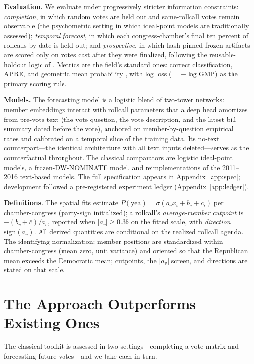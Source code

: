 \documentclass[12pt]{article}
\begin{document}
\textbf{Evaluation.} We evaluate under progressively stricter
information constraints: \emph{completion}, in which random votes are
held out and same-rollcall votes remain observable (the psychometric
setting in which ideal-point models are traditionally assessed);
\emph{temporal forecast}, in which each congress-chamber's final ten
percent of rollcalls by date is held out; and \emph{prospective}, in
which hash-pinned frozen artifacts are scored only on votes cast
after they were finalized, following the reusable-holdout logic of
\citet{dwork2015holdout}. Metrics are the field's standard ones:
correct classification, APRE, and geometric mean probability
\citep{carroll2013structure}, with log loss ($= -\log \mathrm{GMP}$)
as the primary scoring rule.

\textbf{Models.} The forecasting model is a logistic blend of
two-tower networks: member embeddings interact with rollcall
parameters that a deep head amortizes from pre-vote text (the vote
question, the vote description, and the latest bill summary dated
before the vote), anchored on member-by-question empirical rates and
calibrated on a temporal slice of the training data. Its no-text
counterpart---the identical architecture with all text inputs
deleted---serves as the counterfactual throughout. The classical
comparators are logistic ideal-point models, a frozen-DW-NOMINATE
model, and reimplementations of the 2011--2016 text-based models.
The full specification appears in Appendix~\ref{app:spec};
development followed a pre-registered experiment ledger
(Appendix~\ref{app:ledger}).

\textbf{Definitions.} The spatial fits estimate $P(\text{yea}) =
\sigma(a_v x_i + b_v + c_i)$ per chamber-congress (party-sign
initialized); a rollcall's \emph{average-member cutpoint} is
$-(b_v + \bar c)/a_v$, reported when $|a_v| \geq 0.35$ on the fitted
scale, with \emph{direction} $\mathrm{sign}(a_v)$. All derived
quantities are conditional on the realized rollcall agenda. The
identifying normalization: member positions are standardized within
chamber-congress (mean zero, unit variance) and oriented so that the
Republican mean exceeds the Democratic mean; cutpoints, the
$|a_v|$ screen, and directions are stated on that scale.

\section{The Approach Outperforms Existing Ones}
\label{sec:outperform}

The classical toolkit is assessed in two settings---completing a vote
matrix and forecasting future votes---and we take each in turn.
\end{document}
